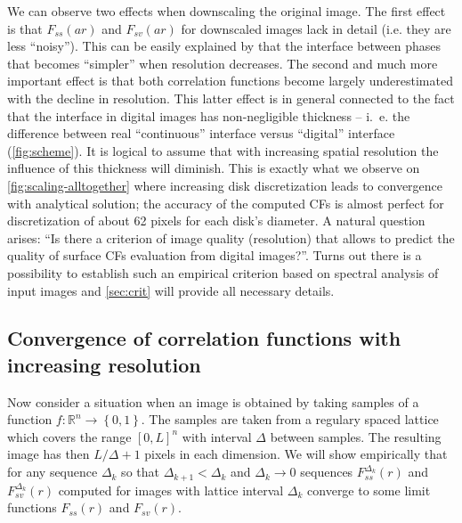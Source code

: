 \documentclass[reprint,amsmath,amssymb,aps,pre,showkeys,showpacs]{revtex4-1}
\begin{document}
We can observe two effects when downscaling the original image. The
first effect is that $F_{ss}(ar)$ and $F_{sv}(ar)$ for downscaled images lack in
detail (i.e. they are less ``noisy''). This can be easily explained by that the
interface between phases that becomes ``simpler'' when resolution decreases. The
second and much more important effect is that both correlation functions become
largely underestimated with the decline in resolution. This latter effect is in
general connected to the fact that the interface in digital images has
non-negligible thickness -- i.~e. the difference between real ``continuous''
interface versus ``digital'' interface (\cref{fig:scheme}). It is logical to
assume that with increasing spatial resolution the influence of this thickness
will diminish. This is exactly what we observe on \cref{fig:scaling-alltogether}
where increasing disk discretization leads to convergence with analytical
solution; the accuracy of the computed CFs is almost perfect for discretization
of about 62 pixels for each disk's diameter. A natural question arises: ``Is
there a criterion of image quality (resolution) that allows to predict the
quality of surface CFs evaluation from digital images?''. Turns out there is a
possibility to establish such an empirical criterion based on spectral analysis
of input images and \cref{sec:crit} will provide all necessary details.

\subsection{Convergence of correlation functions with increasing resolution}
\label{sec:value-noise}
Now consider a situation when an image is obtained by taking samples of a function
$f: \mathbb{R}^n \rightarrow \left\{0, 1\right\}$. The samples are taken from a
regulary spaced lattice which covers the range $[0, L]^n$  with interval
$\Delta$ between samples. The resulting image has then $L/\Delta + 1$ pixels in
each dimension. We will show empirically that for any sequence $\Delta_k$ so
that $\Delta_{k+1} < \Delta_k$ and $\Delta_k \rightarrow 0$ sequences
$F_{ss}^{\Delta_k}(r)$ and $F_{sv}^{\Delta_k}(r)$ computed for images with
lattice interval $\Delta_k$ converge to some limit functions $F_{ss}(r)$ and
$F_{sv}(r)$.
\end{document}
